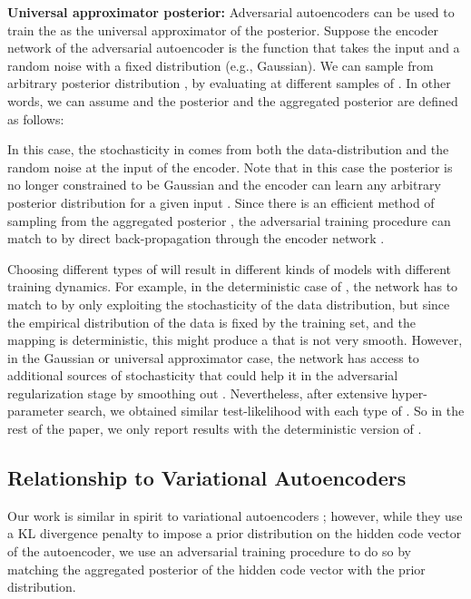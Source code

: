 \documentclass{article}
\begin{document}
{\bf Universal approximator posterior:} Adversarial autoencoders can be used to train the  as the universal approximator of the posterior. Suppose the encoder network of the adversarial autoencoder is the function  that takes the input  and a random noise  with a fixed distribution (e.g., Gaussian). We can sample from arbitrary posterior distribution , by evaluating  at different samples of . In other words, we can assume  and the posterior  and the aggregated posterior  are defined as follows:

\vspace{-.2cm}


\vspace{-.2cm}




In this case, the stochasticity in  comes from both the data-distribution and the random noise  at the input of the encoder.
Note that in this case the posterior  is no longer constrained to be Gaussian and the encoder can learn any arbitrary posterior distribution for a given input . Since there is an efficient method of sampling from the aggregated posterior , the adversarial training procedure can match  to  by direct back-propagation through the encoder network .

Choosing different types of  will result in different kinds of models with different training dynamics. For example, in the deterministic case of , the network has to match  to  by only exploiting the stochasticity of the data distribution, but since the empirical distribution of the data is fixed by the training set, and the mapping is deterministic, this might produce a  that is not very smooth. However, in the Gaussian or universal approximator case, the network has access to additional sources of stochasticity that could help it in the adversarial regularization stage by smoothing out . Nevertheless, after extensive hyper-parameter search, we obtained similar test-likelihood with each type of . So in the rest of the paper, we only report results with the deterministic version of .


\subsection{Relationship to Variational Autoencoders}

Our work is similar in spirit to variational autoencoders \citep{vae}; however, while they use a KL divergence penalty to impose a prior distribution on the hidden code vector of the autoencoder, we use an adversarial training procedure to do so by matching the aggregated posterior of the hidden code vector with the prior distribution.
\end{document}
